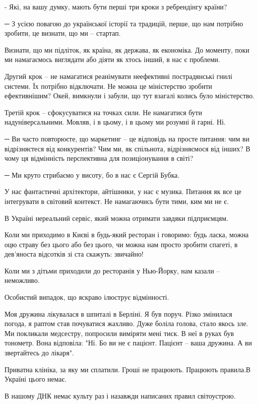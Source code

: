 - Які, на вашу думку, мають бути перші три кроки з ребрендінгу країни? 

─ З усією повагою до української історії та традицій, перше, що нам потрібно зробити, це визнати, що ми – стартап. 

Визнати, що ми підліток, як країна, як держава, як економіка. До моменту, поки
ми намагаємось виглядати або діяти як хтось інший, в нас є проблеми.

Другий крок – не намагатися реанімувати неефективні пострадянські гнилі
системи. Їх потрібно відключати. Не можна це міністерство зробити ефективнішим?
Окей, вимкнули і забули, що тут взагалі колись було міністерство.

Третій крок – сфокусуватися на точках сили. Не намагатися бути
надуніверсальними. Мовляв, і в цьому, і в цьому ми розумні й гарні. Ні.

─ Ви часто повторюєте, що маркетинг – це відповідь на просте питання: чим ви
відрізняєтеся від конкурентів? Чим ми, як спільнота, відрізняємося від інших? В
чому ця відмінність перспективна для позиціонування в світі?

─ Ми круто стрибаємо у висоту, бо в нас є Сергій Бубка.

У нас фантастичні архітектори, айтішники, у нас є музика. Питання як все це
інтегрувати в світовий контекст. Не намагаючись бути тими, ким ми не є.

В Україні нереальний сервіс, який можна отримати завдяки підприємцям.

Коли ми приходимо в Києві в будь-який ресторан і говоримо: будь ласка, можна
оцю страву без цього або без цього, чи можна нам просто зробити спагеті, в
дев’яноста відсотків зі ста скажуть: звичайно!

Коли ми з дітьми приходили до ресторанів у Нью-Йорку, нам казали – неможливо.

Особистий випадок, що яскраво ілюструє відмінності.

Моя дружина лікувалася в шпиталі в Берліні. Я був поруч. Різко змінилася
погода, я раптом став почуватися жахливо. Дуже боліла голова, стало якось зле.
Ми покликали медсестру, попросили виміряти мені тиск. В неї в руках був
тонометр. Вона відповіла: "Ні. Бо ви не є пацієнт. Пацієнт – ваша дружина. А ви
звертайтесь до лікаря".

Приватна клініка, за яку ми сплатили. Гроші не працюють. Працюють правила.В
Україні цього немає. 

В нашому ДНК немає культу раз і назавжди написаних правил світоустрою.

